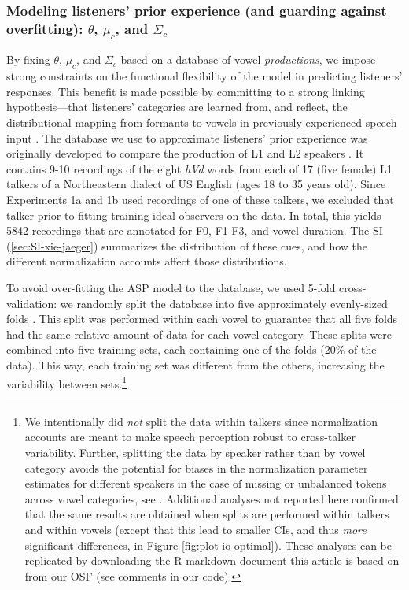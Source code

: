 \documentclass[preprint]{JASA}
\begin{document}
\subsubsection{\texorpdfstring{Modeling listeners' prior experience (and guarding against overfitting): \(\theta\), \(\mu_c\), and \(\Sigma_c\)}{Modeling listeners' prior experience (and guarding against overfitting): \textbackslash theta, \textbackslash mu\_c, and \textbackslash Sigma\_c}}\label{modeling-listeners-prior-experience-and-guarding-against-overfitting-theta-mu_c-and-sigma_c}

By fixing \(\theta\), \(\mu_c\), and \(\Sigma_c\) based on a database of vowel \emph{productions}, we impose strong constraints on the functional flexibility of the model in predicting listeners' responses. This benefit is made possible by committing to a strong linking hypothesis---that listeners' categories are learned from, and reflect, the distributional mapping from formants to vowels in previously experienced speech input \citep[e.g.,][]{abramson-lisker1973, massaro-friedman1990, nearey-hogan1986}. The database we use to approximate listeners' prior experience was originally developed to compare the production of L1 and L2 speakers \citep{xie-jaeger2020}. It contains 9-10 recordings of the eight \emph{hVd} words from each of 17 (five female) L1 talkers of a Northeastern dialect of US English (ages 18 to 35 years old). Since Experiments 1a and 1b used recordings of one of these talkers, we excluded that talker prior to fitting training ideal observers on the data. In total, this yields 5842 recordings that are annotated for F0, F1-F3, and vowel duration. The SI (\ref{sec:SI-xie-jaeger}) summarizes the distribution of these cues, and how the different normalization accounts affect those distributions.

To avoid over-fitting the ASP model to the database, we used 5-fold cross-validation: we randomly split the \citet{xie-jaeger2020} database into five approximately evenly-sized folds \citep[following][]{persson-jaeger2023}. This split was performed within each vowel to guarantee that all five folds had the same relative amount of data for each vowel category. These splits were combined into five training sets, each containing one of the folds (20\% of the data). This way, each training set was different from the others, increasing the variability between sets.\footnote{We intentionally did \emph{not} split the data within talkers since normalization accounts are meant to make speech perception robust to cross-talker variability. Further, splitting the data by speaker rather than by vowel category avoids the potential for biases in the normalization parameter estimates for different speakers in the case of missing or unbalanced tokens across vowel categories, see \citep{barreda-nearey2018}. Additional analyses not reported here confirmed that the same results are obtained when splits are performed within talkers and within vowels (except that this lead to smaller CIs, and thus \emph{more} significant differences, in Figure \ref{fig:plot-io-optimal}). These analyses can be replicated by downloading the R markdown document this article is based on from our OSF (see comments in our code).}
\end{document}
